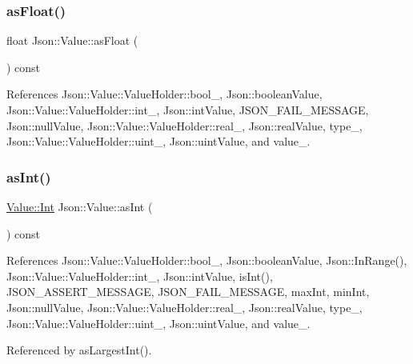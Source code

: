 \subsubsection{\texorpdfstring{as\+Float()}{asFloat()}}
{\footnotesize\ttfamily float Json\+::\+Value\+::as\+Float (\begin{DoxyParamCaption}{ }\end{DoxyParamCaption}) const}



References Json\+::\+Value\+::\+Value\+Holder\+::bool\+\_\+, Json\+::boolean\+Value, Json\+::\+Value\+::\+Value\+Holder\+::int\+\_\+, Json\+::int\+Value, J\+S\+O\+N\+\_\+\+F\+A\+I\+L\+\_\+\+M\+E\+S\+S\+A\+GE, Json\+::null\+Value, Json\+::\+Value\+::\+Value\+Holder\+::real\+\_\+, Json\+::real\+Value, type\+\_\+, Json\+::\+Value\+::\+Value\+Holder\+::uint\+\_\+, Json\+::uint\+Value, and value\+\_\+.

\mbox{\label{classJson_1_1Value_a614d635bc248a592593feb322cd15ab8_a614d635bc248a592593feb322cd15ab8}} 
\subsubsection{\texorpdfstring{as\+Int()}{asInt()}}
{\footnotesize\ttfamily \hyperlink{classJson_1_1Value_abdf7a7ff73eb130ffcab28504ffdb405_abdf7a7ff73eb130ffcab28504ffdb405}{Value\+::\+Int} Json\+::\+Value\+::as\+Int (\begin{DoxyParamCaption}{ }\end{DoxyParamCaption}) const}



References Json\+::\+Value\+::\+Value\+Holder\+::bool\+\_\+, Json\+::boolean\+Value, Json\+::\+In\+Range(), Json\+::\+Value\+::\+Value\+Holder\+::int\+\_\+, Json\+::int\+Value, is\+Int(), J\+S\+O\+N\+\_\+\+A\+S\+S\+E\+R\+T\+\_\+\+M\+E\+S\+S\+A\+GE, J\+S\+O\+N\+\_\+\+F\+A\+I\+L\+\_\+\+M\+E\+S\+S\+A\+GE, max\+Int, min\+Int, Json\+::null\+Value, Json\+::\+Value\+::\+Value\+Holder\+::real\+\_\+, Json\+::real\+Value, type\+\_\+, Json\+::\+Value\+::\+Value\+Holder\+::uint\+\_\+, Json\+::uint\+Value, and value\+\_\+.



Referenced by as\+Largest\+Int().

\mbox{\label{classJson_1_1Value_aa647ac4fe51a2e325c063ebe32262b44_aa647ac4fe51a2e325c063ebe32262b44}} 

